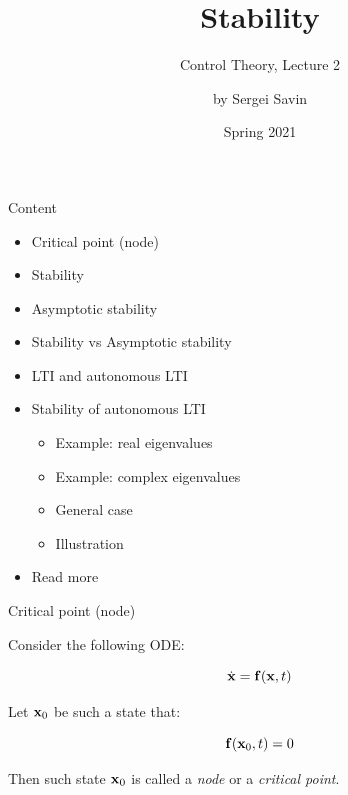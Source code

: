 \documentclass{beamer}
\title{Stability}
\subtitle{Control Theory, Lecture 2}
\author{by Sergei Savin}
\date{Spring 2021}
\begin{document}
\maketitle


\begin{frame}{Content}

\begin{itemize}
\item Critical point (node)
\item Stability
\item Asymptotic stability
\item Stability vs Asymptotic stability
\item LTI and autonomous LTI
\item Stability of autonomous LTI
    \begin{itemize}
    \item Example: real eigenvalues
    \item Example: complex eigenvalues
    \item General case
    \item Illustration
    \end{itemize}
\item Read more
\end{itemize}

\end{frame}



\begin{frame}{Critical point (node)}
\begin{flushleft}

Consider the following ODE:

\begin{equation}
    \dot{\mathbf{x}} = \mathbf{f} (\mathbf{x}, t)
\end{equation}

Let $\mathbf{x}_0$ be such a state that:

\begin{equation}
    \mathbf{f} (\mathbf{x}_0, t) = 0
\end{equation}

Then such state $\mathbf{x}_0$ is called a \emph{node} or a \emph{critical point}.

\end{flushleft}
\end{frame}
\end{document}
